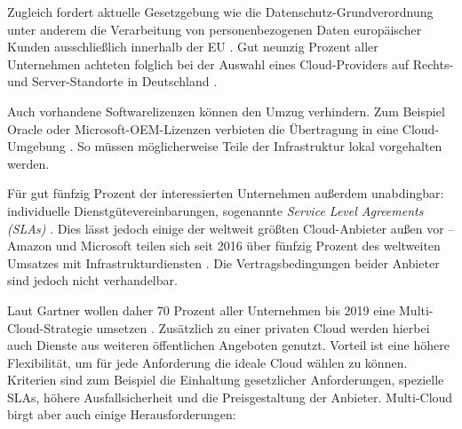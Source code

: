 Zugleich fordert aktuelle Gesetzgebung wie die Datenschutz-Grundverordnung unter anderem die Verarbeitung von personenbezogenen Daten europäischer Kunden ausschließlich innerhalb der EU \cite{eu:2016:bdsvg}. %
Gut neunzig Prozent aller Unternehmen achteten folglich bei der Auswahl eines Cloud-Providers auf Rechts- und Server-Standorte in Deutschland \cite{gartner:2017:cloud-market}. 

Auch vorhandene Softwarelizenzen können den Umzug verhindern. Zum Beispiel Oracle oder Microsoft-OEM-Lizenzen verbieten die Übertragung in eine Cloud-Umgebung \cite{microsoft:2017:licensing, oracle:2018:licensing}. So müssen möglicherweise Teile der Infrastruktur lokal vorgehalten werden.

Für gut fünfzig Prozent der interessierten Unternehmen außerdem unabdingbar: individuelle Dienstgütevereinbarungen, sogenannte \emph{Service Level Agreements (SLAs)} \cite{bitkom:2017:cloud-nutzung-unternehmen-auswahlkriterien}.
Dies lässt jedoch einige der weltweit größten Cloud-Anbieter außen vor -- Amazon und Microsoft teilen sich seit 2016 über fünfzig Prozent des weltweiten Umsatzes mit Infrastrukturdiensten \cite{gartner:2017:cloud-market}. Die Vertragsbedingungen beider Anbieter sind jedoch nicht verhandelbar. %

Laut Gartner wollen daher 70 Prozent aller Unternehmen bis 2019 eine Multi-Cloud-Strategie umsetzen \cite{gartner:2017:cloud-market-multicloud-trend}. Zusätzlich zu einer privaten Cloud werden hierbei auch Dienste aus weiteren öffentlichen Angeboten genutzt. Vorteil ist eine höhere Flexibilität, um für jede Anforderung die ideale Cloud wählen zu können. Kriterien sind zum Beispiel die Einhaltung gesetzlicher Anforderungen, spezielle SLAs, höhere Ausfallsicherheit und die Preisgestaltung der Anbieter. Multi-Cloud birgt aber auch einige Herausforderungen:


